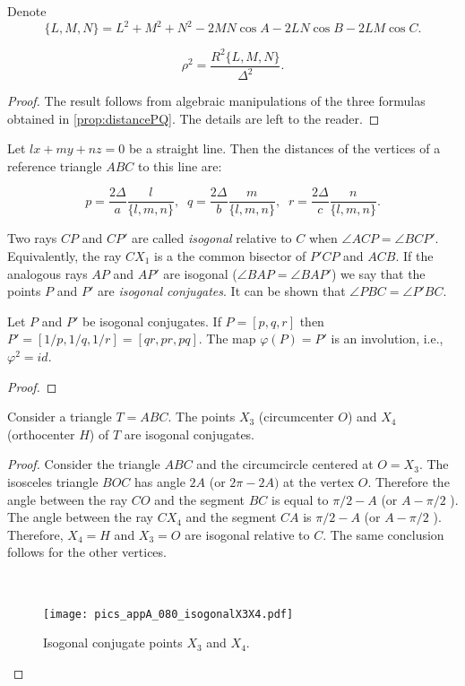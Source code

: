 Denote
\[ \{L,M,N\}= L^2+
M^2+N^2-2MN\cos A-2LN\cos B-2LM\cos C. 
\]

\begin{proposition}
	
	\[\rho^2=\frac{R^2 \{L,M,N\}}
	{\Delta^2}.\] 
	\end{proposition}
	
	
\begin{proof} The result follows from algebraic manipulations of the three formulas obtained in \cref{prop:distancePQ}. The details are left to the reader.
\end{proof}

\begin{proposition} Let $lx+my+nz=0$ be a straight line.
	Then the distances of the
	vertices of a reference triangle $ABC$ to this line are:
	
	\[p= \frac{2\Delta}{a}\frac{l}{\{l,m,n\}},\;\;
	q=\frac{2\Delta}{b}\frac{m}{
		\{l,m,n\}},\;\;
 r=\frac{2\Delta}{c }\frac{n}{
 \{l,m,n\}}.\]
 
	
\end{proposition}



Two rays $CP$ and $CP'$ are called {\em  isogonal } relative to $C$ when $\angle ACP=\angle BCP'$. Equivalently, the ray $CX_1$ is a the common bisector of $P'CP$ and $ACB$.
If the analogous rays $AP$ and $AP'$ are isogonal ($\angle BAP=\angle BAP'$) we say that the points $P$ and $P'$ are {\em isogonal conjugates}. It can be shown that    
$\angle PBC=\angle P'BC$. 

\begin{proposition} Let  $P$ and $P'$ be isogonal conjugates. If $P=[p,q,r]$ then $P'=[1/p,1/q,1/r]=[qr,pr,pq]$. The map $\varphi(P)= P'$ is an involution, i.e., $\varphi^2=id$.
\end{proposition}

\begin{proof}
 
\end{proof}

\begin{proposition} Consider a triangle $T=ABC$. The points $X_3$ (circumcenter $O$) and $X_4$ (orthocenter $H$)  of $T$ are  isogonal conjugates.  
\end{proposition}

\begin{proof} 
	Consider the triangle $ABC$ and the circumcircle centered at $O=X_3$. The isosceles triangle $BOC$ has  angle $2A$ (or $2\pi-2A) $ at the vertex $O$. Therefore the angle between the ray $CO$ and the segment $BC$ is equal to $\pi/2-A$ (or $A-\pi/2$ ). The  angle between the ray $CX_4$ and the segment $CA$ is $\pi/2-A$ (or $A-\pi/2$ ). Therefore, $X_4=H$ and $X_3=O$ are isogonal relative to $C$. The same conclusion follows for the other vertices. 
		\begin{figure}[H]\ 
		\begin{center}
		 \texttt{[image: pics\_appA\_080\_isogonalX3X4.pdf]}
			\caption { \label{fig:X3X4}   Isogonal conjugate points $X_3$ and $X_4$.}
		\end{center}
	\end{figure}
\end{proof}


